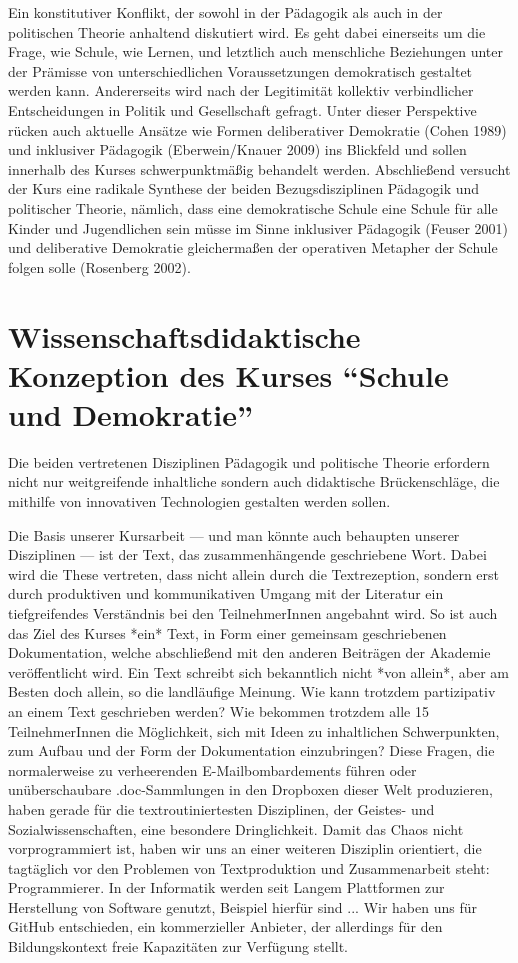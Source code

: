 \documentclass[11pt,a4paper,oneside]{article}
\begin{document}
Ein konstitutiver Konflikt, der sowohl in der Pädagogik als auch in der politischen Theorie anhaltend diskutiert wird.
Es geht dabei einerseits um die Frage, wie Schule, wie Lernen, und letztlich auch menschliche Beziehungen unter der Prämisse von unterschiedlichen Voraussetzungen demokratisch gestaltet werden kann.
Andererseits wird nach der Legitimität kollektiv verbindlicher Entscheidungen in Politik und Gesellschaft gefragt.
Unter dieser Perspektive rücken auch aktuelle Ansätze wie Formen deliberativer Demokratie (Cohen 1989) und inklusiver Pädagogik (Eberwein/Knauer 2009) ins Blickfeld und sollen innerhalb des Kurses schwerpunktmäßig behandelt werden.
Abschließend versucht der Kurs eine radikale Synthese der beiden Bezugsdisziplinen Pädagogik und politischer Theorie, nämlich, dass eine demokratische Schule eine Schule für alle Kinder und Jugendlichen sein müsse im Sinne inklusiver Pädagogik (Feuser 2001) und deliberative Demokratie gleichermaßen der operativen Metapher der Schule folgen solle (Rosenberg 2002).

\section{Wissenschaftsdidaktische Konzeption des Kurses ``Schule und Demokratie''}

Die beiden vertretenen Disziplinen Pädagogik und politische Theorie erfordern nicht nur weitgreifende inhaltliche sondern auch didaktische Brückenschläge, die mithilfe von innovativen Technologien gestalten werden sollen.

Die Basis unserer Kursarbeit --- und man könnte auch behaupten unserer Disziplinen --- ist der Text, das zusammenhängende geschriebene Wort.
Dabei wird die These vertreten, dass nicht allein durch die Textrezeption, sondern erst durch produktiven und kommunikativen Umgang mit der Literatur ein tiefgreifendes Verständnis bei den TeilnehmerInnen angebahnt wird.
So ist auch das Ziel des Kurses *ein* Text, in Form einer gemeinsam geschriebenen Dokumentation, welche abschließend mit den anderen Beiträgen der Akademie veröffentlicht wird.
Ein Text schreibt sich bekanntlich nicht *von allein*, aber am Besten doch allein, so die landläufige Meinung.
Wie kann trotzdem partizipativ an einem Text geschrieben werden?
Wie bekommen trotzdem alle 15 TeilnehmerInnen die Möglichkeit, sich mit Ideen zu inhaltlichen Schwerpunkten, zum Aufbau und der Form der Dokumentation einzubringen?
Diese Fragen, die normalerweise zu verheerenden E-Mailbombardements führen oder unüberschaubare .doc-Sammlungen in den Dropboxen dieser Welt produzieren, haben gerade für die textroutiniertesten Disziplinen, der Geistes- und Sozialwissenschaften, eine besondere Dringlichkeit.
Damit das Chaos nicht vorprogrammiert ist, haben wir uns an einer weiteren Disziplin orientiert, die tagtäglich vor den Problemen von Textproduktion und Zusammenarbeit steht: Programmierer.
In der Informatik werden seit Langem Plattformen zur Herstellung von Software genutzt, Beispiel hierfür sind ...
Wir haben uns für GitHub entschieden, ein kommerzieller Anbieter, der allerdings für den Bildungskontext freie Kapazitäten zur Verfügung stellt.
\end{document}

